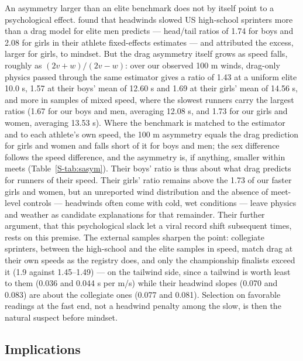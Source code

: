 \documentclass[12pt,a4paper]{article}
\begin{document}
An asymmetry larger than an elite benchmark does not by itself point to a psychological effect. \citet{lybbert2023} found that headwinds slowed US high-school sprinters more than a drag model for elite men predicts --- head/tail ratios of 1.74 for boys and 2.08 for girls in their athlete fixed-effects estimates --- and attributed the excess, larger for girls, to mindset. But the drag asymmetry itself grows as speed falls, roughly as $(2v+w)/(2v-w)$: over our observed 100 m winds, drag-only physics passed through the same estimator gives a ratio of 1.43 at a uniform elite 10.0 s, 1.57 at their boys' mean of 12.60 s and 1.69 at their girls' mean of 14.56 s, and more in samples of mixed speed, where the slowest runners carry the largest ratios (1.67 for our boys and men, averaging 12.08 s, and 1.73 for our girls and women, averaging 13.53 s). Where the benchmark is matched to the estimator and to each athlete's own speed, the 100 m asymmetry equals the drag prediction for girls and women and falls short of it for boys and men; the sex difference follows the speed difference, and the asymmetry is, if anything, smaller within meets (Table~\ref{S-tab:sasym}). Their boys' ratio is thus about what drag predicts for runners of their speed. Their girls' ratio remains above the 1.73 of our faster girls and women, but an unreported wind distribution and the absence of meet-level controls --- headwinds often come with cold, wet conditions --- leave physics and weather as candidate explanations for that remainder. Their further argument, that this psychological slack let a viral record shift subsequent times, rests on this premise. The external samples sharpen the point: collegiate sprinters, between the high-school and the elite samples in speed, match drag at their own speeds as the registry does, and only the championship finalists exceed it (1.9 against 1.45--1.49) --- on the tailwind side, since a tailwind is worth least to them (0.036 and 0.044 s per m/s) while their headwind slopes (0.070 and 0.083) are about the collegiate ones (0.077 and 0.081). Selection on favorable readings at the fast end, not a headwind penalty among the slow, is then the natural suspect before mindset.

\subsection{Implications}
\end{document}
